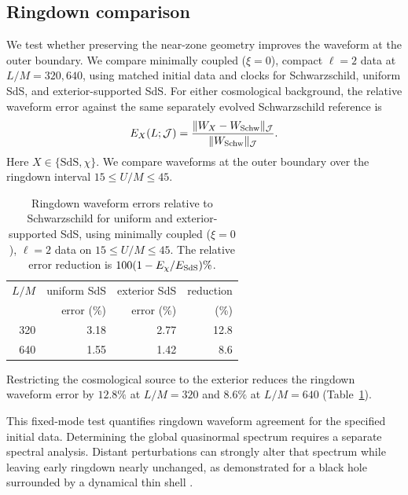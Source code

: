 \documentclass[
 aps,
 prd,
 reprint,
 superscriptaddress,
 nofootinbib,
 longbibliography
]{revtex4-2}
\begin{document}
\subsection{Ringdown comparison}
\label{sec:exterior-tests}

We test whether preserving the near-zone geometry
improves the waveform at the outer boundary.  We compare minimally coupled
($\xi=0$), compact $\ell=2$ data at $L/M=320,640$, using matched initial
data and clocks for Schwarzschild, uniform SdS, and exterior-supported SdS.
For either cosmological background, the relative waveform error against the
same separately evolved Schwarzschild reference is
\begin{equation}
 E_X(L;\mathcal J)
 =\frac{\|W_X-W_{\rm Schw}\|_{\mathcal J}}{\|W_{\rm Schw}\|_{\mathcal J}}.
 \label{eq:exterior_waveform_error}
\end{equation}
Here $X\in\{\mathrm{SdS},\chi\}$.  We compare waveforms at the outer boundary
over the ringdown interval $15\leq U/M\leq45$.

\begin{table}[t]
\caption{Ringdown waveform errors relative to Schwarzschild for uniform
 and exterior-supported SdS, using minimally coupled ($\xi=0$), $\ell=2$
 data on $15\leq U/M\leq45$.  The relative error reduction is
 $100(1-E_\chi/E_{\rm SdS})\%$.}
\label{tab:exterior-qnm-improvement}
\begin{ruledtabular}
\begin{tabular}{rrrr}
$L/M$ & uniform SdS & exterior SdS & reduction\\
 & error (\%) & error (\%) & (\%)\\
\hline
320 & 3.18 & 2.77 & 12.8\\
640 & 1.55 & 1.42 &  8.6\\
\end{tabular}
\end{ruledtabular}
\end{table}

Restricting the cosmological source to the exterior reduces the ringdown
waveform error by $12.8\%$ at $L/M=320$ and $8.6\%$ at $L/M=640$
(Table~\ref{tab:exterior-qnm-improvement}).  

This fixed-mode test quantifies ringdown waveform agreement for the specified
initial data.
Determining the global quasinormal spectrum requires a separate spectral analysis.
Distant perturbations can strongly alter that spectrum
\cite{CheungEtAl:2022elephant} while leaving early ringdown nearly unchanged,
as demonstrated for a black hole surrounded by a dynamical thin shell
\cite{LaeugerEtAl:2025shell}.
\end{document}
